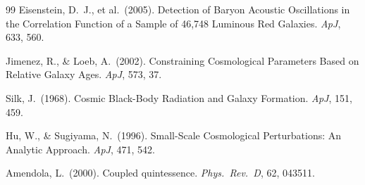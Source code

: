 \documentclass[12pt,a4paper]{article}
\begin{document}
\begin{thebibliography}{99}
Eisenstein, D.~J., et al.\ (2005).
Detection of Baryon Acoustic Oscillations in the Correlation Function of a Sample of 46,748 Luminous Red Galaxies.
\textit{ApJ}, 633, 560.

Jimenez, R., \& Loeb, A.\ (2002).
Constraining Cosmological Parameters Based on Relative Galaxy Ages.
\textit{ApJ}, 573, 37.

Silk, J.\ (1968).
Cosmic Black-Body Radiation and Galaxy Formation.
\textit{ApJ}, 151, 459.

Hu, W., \& Sugiyama, N.\ (1996).
Small-Scale Cosmological Perturbations: An Analytic Approach.
\textit{ApJ}, 471, 542.

Amendola, L.\ (2000).
Coupled quintessence.
\textit{Phys.~Rev.~D}, 62, 043511.

\end{thebibliography}
\end{document}
